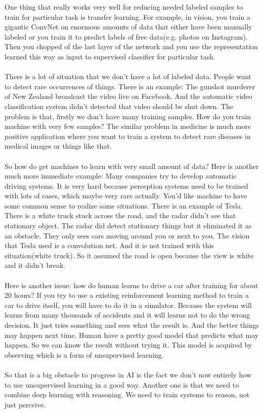 \documentclass{article}
\begin{document}
One thing that really works very well for reducing needed labeled samples to train for particular task is transfer learning. For example, in vision, you train a gigantic ConvNet on enormous amounts of data that either have been manually labeled or you train it to predict labels of free data(e.g. photos on Instagram). Then you chopped of the last layer of the network and you use the representation learned this way as input to supervised classifier for particular task. \\ \\

There is a lot of situation that we don't have a lot of labeled data. People want to detect rare occurrences of things. There is an example: The gunshot murderer of New Zealand broadcast the video live on Facebook. And the automatic video classification system didn't detected that video should be shut down. The problem is that, firstly we don't have many training samples. How do you train machine with very few samples? The similar problem in medicine is much more positive application where you want to train a system to detect rare diseases in medical images or things like that.\\ \\

So how do get machines to learn with very small amount of data? Here is another much more immediate example: Many companies try to develop automatic driving systems. It is very hard because perception systems need to be trained with lots of cases, which maybe very rare actually. You'd like machine to have some common sense to realize some situations. There is an example of Tesla. There is a white truck stuck across the road, and the radar didn't see that stationary object. The radar did detect stationary things but it eliminated it as an obstacle. They only sees cars moving around you or next to you. The vision that Tesla used is a convolution net. And it is not trained with this situation(white truck). So it assumed the road is open because the view is white and it didn't break.\\ \\

Here is another issue: how do human learns to drive a car after training for about 20 hours? If you try to use a existing reinforcement learning method to train a car to drive itself, you will have to do it in a simulator. Because the system will learns from many thousands of accidents and it will learns not to do the wrong decision. It just tries something and sees what the result is. And the better things may happen next time. Human have a pretty good model that predicts what may happen. So we can know the result without trying it. This model is acquired by observing which is a form of unsupervised learning.\\ \\
So that is a big obstacle to progress in AI is the fact we don't now entirely how to use unsupervised learning in a good way. Another one is that we need to combine deep learning with reasoning. We need to train systems to reason, not just perceive. \\ \\
\end{document}
